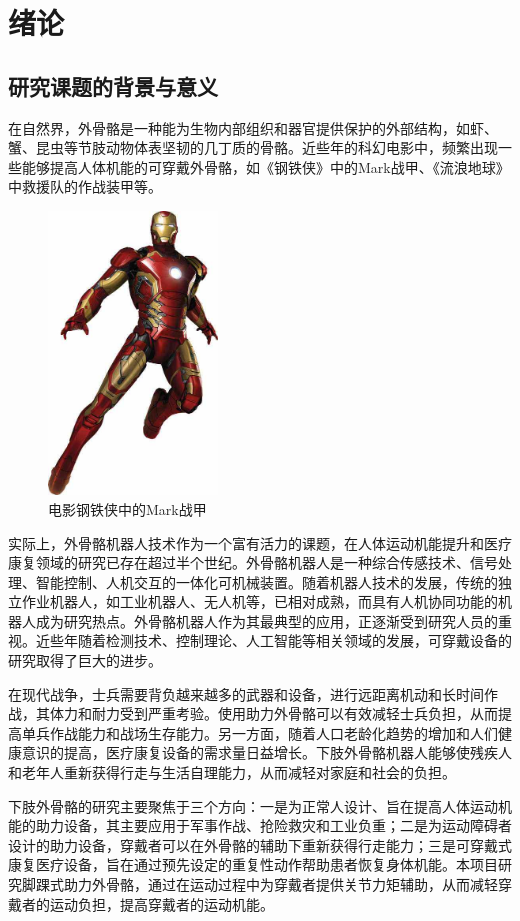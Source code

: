 \chapter{绪论}
\section{研究课题的背景与意义}
在自然界，外骨骼是一种能为生物内部组织和器官提供保护的外部结构，如虾、蟹、昆虫等节肢动物体表坚韧的几丁质的骨骼。近些年的科幻电影中，频繁出现一些能够提高人体机能的可穿戴外骨骼，如《钢铁侠》中的Mark战甲、《流浪地球》中救援队的作战装甲等。

\begin{figure}[htb]
    \includegraphics[width=4.5cm]{fig/f2.jpg}
    \caption{电影钢铁侠中的Mark战甲}
    \label{fig:mark}
\end{figure}

实际上，外骨骼机器人技术作为一个富有活力的课题，在人体运动机能提升\cite{p1}和医疗康复\cite{p2}领域的研究已存在超过半个世纪。外骨骼机器人是一种综合传感技术、信号处理、智能控制、人机交互的一体化可机械装置。随着机器人技术的发展，传统的独立作业机器人，如工业机器人、无人机等，已相对成熟，而具有人机协同功能的机器人成为研究热点。外骨骼机器人作为其最典型的应用，正逐渐受到研究人员的重视。近些年随着检测技术、控制理论、人工智能等相关领域的发展，可穿戴设备的研究取得了巨大的进步。

在现代战争，士兵需要背负越来越多的武器和设备，进行远距离机动和长时间作战，其体力和耐力受到严重考验。使用助力外骨骼可以有效减轻士兵负担，从而提高单兵作战能力和战场生存能力。另一方面，随着人口老龄化趋势的增加和人们健康意识的提高，医疗康复设备的需求量日益增长。下肢外骨骼机器人能够使残疾人和老年人重新获得行走与生活自理能力，从而减轻对家庭和社会的负担。

下肢外骨骼的研究主要聚焦于三个方向：一是为正常人设计、旨在提高人体运动机能的助力设备，其主要应用于军事作战、抢险救灾和工业负重；二是为运动障碍者设计的助力设备，穿戴者可以在外骨骼的辅助下重新获得行走能力；三是可穿戴式康复医疗设备，旨在通过预先设定的重复性动作帮助患者恢复身体机能。本项目研究脚踝式助力外骨骼，通过在运动过程中为穿戴者提供关节力矩辅助，从而减轻穿戴者的运动负担，提高穿戴者的运动机能。

